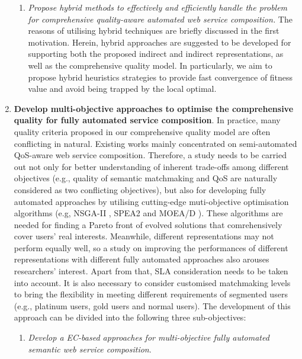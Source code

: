 \begin{enumerate}
\begin{enumerate}
    \item \emph{Propose hybrid methods to effectively and efficiently handle the problem for comprehensive quality-aware automated web service composition.} The reasons of utilising hybrid techniques are briefly discussed in the first motivation. Herein, hybrid approaches are suggested to be developed for supporting both the proposed indirect and indirect representations, as well as the comprehensive quality model. In particularly, we aim to propose hybrid heuristics strategies to provide fast convergence of fitness value and avoid being trapped by the local optimal.
  \end{enumerate}
 
 \item \label{Obj:2} \textbf{Develop multi-objective approaches to optimise the comprehensive quality for fully automated service composition}. In practice, many quality criteria proposed in our comprehensive quality model are often conflicting in natural. Existing works \cite{chen2014partial,xiang2014qos,yin2014hybrid,liu2005dynamic,yu2013efficient,zhang2010qos} mainly concentrated on semi-automated QoS-aware web service composition. Therefore, a study needs to be carried out not only for better understanding of inherent trade-offs among different objectives (e.g., quality of semantic matchmaking and QoS are naturally considered as two conflicting objectives), but also for developing fully automated approaches by utilising cutting-edge muti-objective optimisation algorithms (e.g, NSGA-II \cite{deb2002fast}, SPEA2 \cite{zitzler2001spea2} and MOEA/D \cite{zhang2007moea}). These algorithms are needed for finding a Pareto front of evolved solutions that comrehensively cover users' real interests. Meanwhile, different representations may not perform equally well, so a study on improving the performances of different representations with different fully automated approaches also arouses researchers' interest. Apart from that, SLA consideration needs to be taken into account. It is also necessary to consider customised matchmaking levels to bring the flexibility in meeting different requirements of segmented users (e.g., platinum users, gold users and normal users). The development of this approach can be divided into the following three sub-objectives:
   \begin{enumerate}
   
    \item \label{Obj:2.1} \emph{Develop a EC-based approaches for multi-objective fully automated semantic web service composition}. 
    

\end{enumerate}
\end{enumerate}
